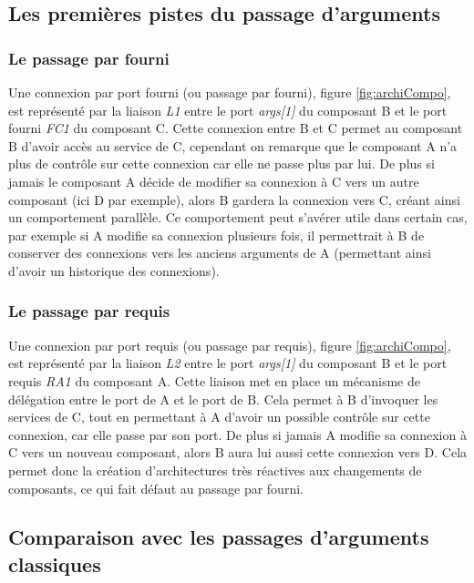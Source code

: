   \subsection{Les premières pistes du passage d'arguments}
  
      \subsubsection{Le passage par fourni}
      
      Une connexion par port fourni (ou passage par fourni), figure \ref{fig:archiCompo}, est représenté par la liaison \emph{L1} entre le port \emph{args[1]} du composant B et le port fourni \emph{FC1} du composant C. Cette connexion entre B et C permet au composant B d'avoir accès au service de C, cependant on remarque que le composant A n'a plus de contrôle sur cette connexion car elle ne passe plus par lui. De plus si jamais le composant A décide de modifier sa connexion à C vers un autre composant (ici D par exemple), alors B gardera la connexion vers C, créant ainsi un comportement parallèle. Ce comportement peut s'avérer utile dans certain cas, par exemple si A modifie sa connexion plusieurs fois, il permettrait à B de conserver des connexions vers les anciens arguments de A (permettant ainsi d'avoir un historique des connexions). 
      
      \subsubsection{Le passage par requis}
      
      Une connexion par port requis (ou passage par requis), figure \ref{fig:archiCompo}, est représenté par la liaison \emph{L2} entre le port \emph{args[1]} du composant B et le port requis \emph{RA1} du composant A. Cette liaison met en place un mécanisme de délégation entre le port de A et le port de B. Cela permet à B d'invoquer les services de C, tout en permettant à A d'avoir un possible contrôle sur cette connexion, car elle passe par son port. De plus si jamais A modifie sa connexion à C vers un nouveau composant, alors B aura lui aussi cette connexion vers D. Cela permet donc la création d'architectures très réactives aux changements de composants, ce qui fait défaut au passage par fourni. 
      
  \subsection{Comparaison avec les passages d'arguments classiques}
  

